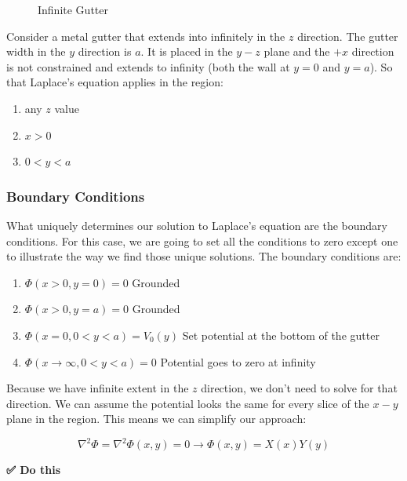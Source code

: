 \begin{figure}
\centering
{}
\caption{Infinite Gutter}
\end{figure}

Consider a metal gutter that extends into infinitely in the \(z\)
direction. The gutter width in the \(y\) direction is \(a\). It is
placed in the \(y-z\) plane and the \(+x\) direction is not constrained
and extends to infinity (both the wall at \(y=0\) and \(y=a\)). So that
Laplace's equation applies in the region:

\begin{enumerate}
\def\labelenumi{\arabic{enumi}.}
\tightlist
\item
  any \(z\) value
\item
  \(x > 0\)
\item
  \(0 < y < a\)
\end{enumerate}

\subsubsection{Boundary Conditions}\label{boundary-conditions}

What uniquely determines our solution to Laplace's equation are the
boundary conditions. For this case, we are going to set all the
conditions to zero except one to illustrate the way we find those unique
solutions. The boundary conditions are:

\begin{enumerate}
\def\labelenumi{\arabic{enumi}.}
\tightlist
\item
  \(\Phi(x>0, y=0) = 0\) Grounded
\item
  \(\Phi(x>0, y=a) = 0\) Grounded
\item
  \(\Phi(x=0, 0 < y < a) = V_0(y)\) Set potential at the bottom of the
  gutter
\item
  \(\Phi(x\rightarrow \infty,0<y<a) = 0\) Potential goes to zero at
  infinity
\end{enumerate}

Because we have infinite extent in the \(z\) direction, we don't need to
solve for that direction. We can assume the potential looks the same for
every slice of the \(x-y\) plane in the region. This means we can
simplify our approach:

\[\nabla^2 \Phi = \nabla^2 \Phi(x,y) = 0 \longrightarrow \Phi(x,y) = X(x)Y(y)\]

\textbf{✅ Do this}

